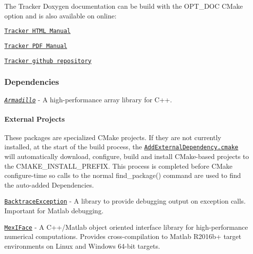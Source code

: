 The Tracker Doxygen documentation can be build with the {\ttfamily O\+P\+T\+\_\+\+D\+OC} C\+Make option and is also available on online\+:
\begin{DoxyItemize}
\item \href{https://markjolah.github.io/Tracker/index.html}{\tt Tracker H\+T\+ML Manual}
\item \href{https://markjolah.github.io/Tracker/pdf/Tracker-0.1-reference.pdf}{\tt Tracker P\+DF Manual}
\item \href{https://github.com/markjolah/Tracker}{\tt Tracker github repository}
\end{DoxyItemize}

\subsubsection*{Dependencies}


\begin{DoxyItemize}
\item \href{http://arma.sourceforge.net/docs.html}{\tt {\itshape Armadillo}} -\/ A high-\/performance array library for C++.
\end{DoxyItemize}

\paragraph*{External Projects}

These packages are specialized C\+Make projects. If they are not currently installed, at the start of the build process, the \href{https://github.com/markjolah/UncommonCMakeModules/blob/master/AddExternalDependency.cmake}{\tt Add\+External\+Dependency.\+cmake} will automatically download, configure, build and install C\+Make-\/based projects to the {\ttfamily C\+M\+A\+K\+E\+\_\+\+I\+N\+S\+T\+A\+L\+L\+\_\+\+P\+R\+E\+F\+IX}. This process is completed before C\+Make configure-\/time so calls to the normal {\ttfamily find\+\_\+package()} command are used to find the auto-\/added Dependencies.


\begin{DoxyItemize}
\item \href{https://markjolah.github.io/BacktraceException}{\tt Backtrace\+Exception} -\/ A library to provide debugging output on exception calls. Important for Matlab debugging.
\item \href{https://markjolah.github.io/MexIFace}{\tt Mex\+I\+Face} -\/ A C++/\+Matlab object oriented interface library for high-\/performance numerical computations. Provides cross-\/compilation to Matlab R2016b+ target environments on Linux and Windows 64-\/bit targets. 
\end{DoxyItemize}